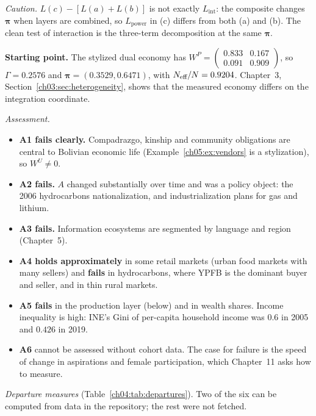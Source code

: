 \documentclass[../solutions_manual.tex]{subfiles}
\begin{document}
\emph{Caution.} $L(c) - [L(a) + L(b)]$ is not exactly $L_{\text{int}}$: the composite changes $\boldsymbol\pi$ when layers are combined, so $L_{\text{power}}$ in (c) differs from both (a) and (b). The clean test of interaction is the three-term decomposition at the same $\boldsymbol\pi$.


\textbf{Starting point.} The stylized dual economy has $W^P = \begin{pmatrix} 0.833 & 0.167\\ 0.091 & 0.909\end{pmatrix}$, so $\Gamma = 0.2576$ and $\boldsymbol\pi = (0.3529, 0.6471)$, with $N_{\text{eff}}/N = 0.9204$. Chapter~3, Section~\ref{ch03:sec:heterogeneity}, shows that the measured economy differs on the integration coordinate.

 \emph{Assessment.}
\begin{itemize}
\item \textbf{A1 fails clearly.} Compadrazgo, kinship and community obligations are central to Bolivian economic life (Example~\ref{ch05:ex:vendors} is a stylization), so $W^U \neq 0$.
\item \textbf{A2 fails.} $A$ changed substantially over time and was a policy object: the 2006 hydrocarbons nationalization, and industrialization plans for gas and lithium.
\item \textbf{A3 fails.} Information ecosystems are segmented by language and region (Chapter~5).
\item \textbf{A4 holds approximately} in some retail markets (urban food markets with many sellers) and \textbf{fails} in hydrocarbons, where YPFB is the dominant buyer and seller, and in thin rural markets.
\item \textbf{A5 fails} in the production layer (below) and in wealth shares. Income inequality is high: INE's Gini of per-capita household income was $0.6$ in 2005 and $0.426$ in 2019.
\item \textbf{A6} cannot be assessed without cohort data. The case for failure is the speed of change in aspirations and female participation, which Chapter~11 asks how to measure.
\end{itemize}

 \emph{Departure measures} (Table~\ref{ch04:tab:departures}). Two of the six can be computed from data in the repository; the rest were not fetched.
\end{document}
